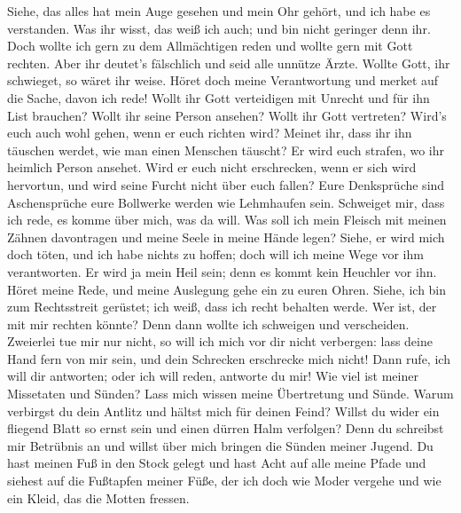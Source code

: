 Siehe, das alles hat mein Auge gesehen und mein Ohr
gehört, und ich habe es verstanden.  Was ihr wisst, das
weiß ich auch; und bin nicht geringer denn ihr.  Doch
wollte ich gern zu dem Allmächtigen reden und wollte gern mit Gott
rechten.  Aber ihr deutet's fälschlich und seid alle
unnütze Ärzte.  Wollte Gott, ihr schwieget, so wäret ihr
weise.  Höret doch meine Verantwortung und merket auf die
Sache, davon ich rede!  Wollt ihr Gott verteidigen mit
Unrecht und für ihn List brauchen?  Wollt ihr seine Person
ansehen? Wollt ihr Gott vertreten?  Wird's euch auch wohl
gehen, wenn er euch richten wird? Meinet ihr, dass ihr ihn täuschen
werdet, wie man einen Menschen täuscht?  Er wird euch
strafen, wo ihr heimlich Person ansehet.  Wird er euch
nicht erschrecken, wenn er sich wird hervortun, und wird seine Furcht
nicht über euch fallen?  Eure Denksprüche sind
Aschensprüche eure Bollwerke werden wie Lehmhaufen sein. 
Schweiget mir, dass ich rede, es komme über mich, was da will.
 Was soll ich mein Fleisch mit meinen Zähnen davontragen
und meine Seele in meine Hände legen?  Siehe, er wird
mich doch töten, und ich habe nichts zu hoffen; doch will ich meine Wege
vor ihm verantworten.  Er wird ja mein Heil sein; denn es
kommt kein Heuchler vor ihn.  Höret meine Rede, und meine
Auslegung gehe ein zu euren Ohren.  Siehe, ich bin zum
Rechtsstreit gerüstet; ich weiß, dass ich recht behalten werde.
 Wer ist, der mit mir rechten könnte? Denn dann wollte
ich schweigen und verscheiden.  Zweierlei tue mir nur
nicht, so will ich mich vor dir nicht verbergen:  lass
deine Hand fern von mir sein, und dein Schrecken erschrecke mich nicht!
 Dann rufe, ich will dir antworten; oder ich will reden,
antworte du mir!  Wie viel ist meiner Missetaten und
Sünden? Lass mich wissen meine Übertretung und Sünde. 
Warum verbirgst du dein Antlitz und hältst mich für deinen Feind?
 Willst du wider ein fliegend Blatt so ernst sein und
einen dürren Halm verfolgen?  Denn du schreibst mir
Betrübnis an und willst über mich bringen die Sünden meiner Jugend.
 Du hast meinen Fuß in den Stock gelegt und hast Acht auf
alle meine Pfade und siehest auf die Fußtapfen meiner Füße,
 der ich doch wie Moder vergehe und wie ein Kleid, das
die Motten fressen.

